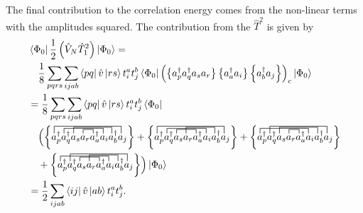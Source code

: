 The final contribution to the correlation energy comes from the non-linear terms with the amplitudes squared. 
The contribution from the $\hat{T}^2$ is given by
    \begin{align*}
        & \bra{\Phi_0} \frac{1}{2} \left( \hat{V}_N \hat{T}_1^2 \right) \ket{\Phi_0} = \\
            & \quad \frac{1}{8} \sum_{pqrs} \sum_{ijab} \bra{pq}\hat{v}\ket{rs} t_i^a t_j^b 
            \bra{\Phi_0} \left(\normord{a^\dagger_p a^\dagger_q a_s  a_r} 
            \normord{a^\dagger_a a_i} \normord{a^\dagger_b a_j} \right)_c\ket{\Phi_0} \\ 
        &= \frac{1}{8} \sum_{pqrs} \sum_{ijab} \bra{pq}\hat{v}\ket{rs} t_i^a t_j^b \bra{\Phi_0} \\
        & \quad \Bigl( 
        \left\{
        \contraction{a^\dagger_p a^\dagger_q a_s}{a}{{}_r}{a}
        \contraction[1.25ex]{a^\dagger_p}{a}{{}^\dagger_q a_s a_r a^\dagger_a}{a}
        \contraction[1.5ex]{a^\dagger_p a^\dagger_q }{a}{{}_s a_r a^\dagger_a a_i}{a}
        \contraction[1.75ex]{}{a}{{}^\dagger_p a^\dagger_q a_s a_r a^\dagger_a a_i a^\dagger_b}{a}
        a^\dagger_p a^\dagger_q a_s  a_r a^\dagger_a a_i a^\dagger_b a_j \right\}
        +\left\{
        \contraction{a^\dagger_p a^\dagger_q}{a}{{}_s a_r}{a}
        \contraction[1.25ex]{a^\dagger_p}{a}{{}^\dagger_q a_s a_r a^\dagger_a}{a}
        \contraction[1.5ex]{a^\dagger_p a^\dagger_q a_s}{a}{{}_r a^\dagger_a a_i}{a}
        \contraction[1.75ex]{}{a}{{}^\dagger_p a^\dagger_q a_s a_r a^\dagger_a a_i a^\dagger_b}{a}
        a^\dagger_p a^\dagger_q a_s  a_r a^\dagger_a a_i a^\dagger_b a_j \right\}
        + \left\{
        \contraction{a^\dagger_p a^\dagger_q a_s}{a}{{}_r}{a}
        \contraction[1.25ex]{}{a}{{}^\dagger_p q^\dagger_q a_s a_r a^\dagger_a}{a}
        \contraction[1.5ex]{a^\dagger_p a^\dagger_q }{a}{{}_s a_r a^\dagger_a a_i}{a}
        \contraction[1.75ex]{a^\dagger_p}{a}{{}^\dagger_q a_s a_r a^\dagger_a a_i a^\dagger_b}{a}
        a^\dagger_p a^\dagger_q a_s  a_r a^\dagger_a a_i a^\dagger_b a_j \right\} \\
        & \quad +\left\{
        \contraction{a^\dagger_p a^\dagger_q}{a}{{}_s a_r}{a}
        \contraction[1.25ex]{}{a}{{}^\dagger_p q^\dagger_q a_s a_r a^\dagger_a}{a}
        \contraction[1.5ex]{a^\dagger_p a^\dagger_q a_s}{a}{{}_r a^\dagger_a a_i}{a}
        \contraction[1.75ex]{a^\dagger_p}{a}{{}^\dagger_q a_s a_r a^\dagger_a a_i a^\dagger_b}{a}
        a^\dagger_p a^\dagger_q a_s  a_r a^\dagger_a a_i a^\dagger_b a_j \right\}
        \Bigr) \ket{\Phi_0} \\ 
        &= \frac{1}{2} \sum_{ijab} \bra{ij}\hat{v}\ket{ab} t_i^a t_j^b.
    \end{align*}
